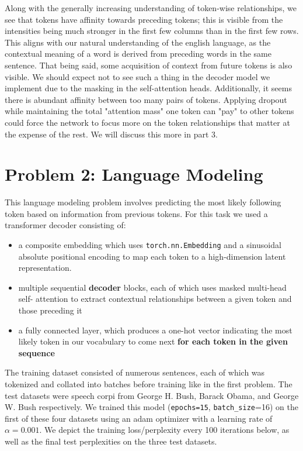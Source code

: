 \documentclass[10pt]{article}
\newcommand{\code}[1]{\texttt{#1}}
\theoremstyle{definition}
\begin{document}
\noindent Along with the generally increasing understanding of token-wise relationships, we see that tokens have affinity towards preceding tokens; this is visible from the intensities being much stronger in the first few columns than in the first few rows. This aligns with our natural understanding of the english language, as the contextual meaning of a word is derived from preceding words in the same sentence. That being said, some acquisition of context from future tokens is also visible. We should expect not to see such a thing in the decoder model we implement due to the masking in the self-attention heads. Additionally, it seems there is abundant affinity between too many pairs of tokens. Applying dropout while maintaining the total "attention mass" one token can "pay" to other tokens could force the network to focus more on the token relationships that matter at the expense of the rest. We will discuss this more in part 3.

\section{Problem 2: Language Modeling}
This language modeling problem involves predicting the most likely following token based on information from previous tokens. For this task we used a transformer decoder consisting of:
\begin{itemize}
    \item a composite embedding which uses \code{torch.nn.Embedding} and a sinusoidal absolute positional encoding to map each token to a high-dimension latent representation.
    \item multiple sequential \textbf{decoder} blocks, each of which uses masked multi-head self- attention to extract contextual relationships between a given token and those preceding it
    \item a fully connected layer, which produces a one-hot vector indicating the most likely token in our vocabulary to come next \textbf{for each token in the given sequence}
\end{itemize}

\noindent The training dataset consisted of numerous sentences, each of which was tokenized and collated into batches before training like in the first problem. The test datasets were speech corpi from George H. Bush, Barack Obama, and George W. Bush respectively. We trained this model (\code{epochs=15}, \code{batch\_size}=16) on the first of these four datasets using an adam optimizer with a learning rate of $\alpha = 0.001$. We depict the training loss/perplexity every 100 iterations below, as well as the final test perplexities on the three test datasets.
\begin{center}
\end{center}
\end{document}
